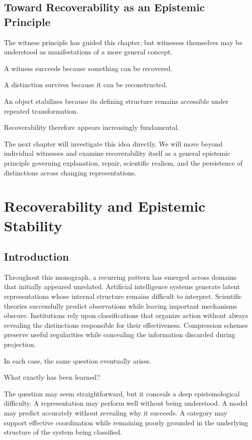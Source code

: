 \documentclass[11pt,oneside,openany]{book}
\begin{document}
\section{Toward Recoverability as an Epistemic Principle}

The witness principle has guided this chapter, but witnesses themselves may be understood as manifestations of a more general concept.

A witness succeeds because something can be recovered.

A distinction survives because it can be reconstructed.

An object stabilizes because its defining structure remains accessible under repeated transformation.

Recoverability therefore appears increasingly fundamental.

The next chapter will investigate this idea directly. We will move beyond individual witnesses and examine recoverability itself as a general epistemic principle governing explanation, repair, scientific realism, and the persistence of distinctions across changing representations.

\chapter{Recoverability and Epistemic Stability}

\section{Introduction}

Throughout this monograph, a recurring pattern has emerged across domains that initially appeared unrelated. Artificial intelligence systems generate latent representations whose internal structure remains difficult to interpret. Scientific theories successfully predict observations while leaving important mechanisms obscure. Institutions rely upon classifications that organize action without always revealing the distinctions responsible for their effectiveness. Compression schemes preserve useful regularities while concealing the information discarded during projection.

In each case, the same question eventually arises.

What exactly has been learned?

The question may seem straightforward, but it conceals a deep epistemological difficulty. A representation may perform well without being understood. A model may predict accurately without revealing why it succeeds. A category may support effective coordination while remaining poorly grounded in the underlying structure of the system being classified.
\end{document}
